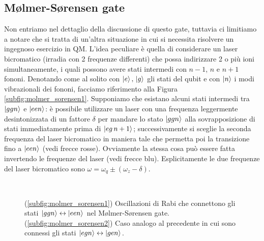\subsection{M\o lmer-S\o rensen gate}
Non entriamo nel dettaglio della discussione di questo gate, tuttavia ci limitiamo a notare che si tratta di un'altra situazione in cui si necessita risolvere un ingegnoso esercizio in QM. L'idea peculiare è quella di considerare un laser bicromatico (irradia con 2 frequenze differenti) che possa indirizzare 2 o più ioni simultaneamente, i quali possono avere stati intermedi con $n-1$, $n$ e $n+1$ fononi. Denotando come al solito con $\ket{e}, \, \ket{g}$ gli stati del qubit e con $\ket{n}$ i modi vibrazionali dei fononi, facciamo riferimento alla Figura \ref{subfig:molmer_sorensen1}. Supponiamo che esistano alcuni stati intermedi tra $\ket{ggn}$ e $\ket{een}$: è possibile utilizzare un laser con una frequenza leggermente desintonizzata di un fattore $\delta$ per mandare lo stato $\ket{ggn}$ alla sovrapposizione di stati immediatamente prima di $\ket{eg \, n+1}$; successivamente si sceglie la seconda frequenza del laser bicromatico in maniera tale che permetta poi la transizione fino a $\ket{een}$ (vedi frecce rosse). Ovviamente la stessa cosa può essere fatta invertendo le frequenze del laser (vedi frecce blu). Esplicitamente le due frequenze del laser bicromatico sono $\omega = \omega_q \pm (\omega_z - \delta)$. 

\begin{figure}[!h]
	\centering	
	 \\
	\caption{(\ref{subfig:molmer_sorensen1}) Oscillazioni di Rabi che connettono gli stati $\ket{ggn} \leftrightarrow \ket{een}$ nel M\o lmer-S\o rensen gate. (\ref{subfig:molmer_sorensen2}) Caso analogo al precedente in cui sono connessi gli stati $\ket{egn} \leftrightarrow \ket{gen}$.}
    \label{fig:molmer_sorensen}
\end{figure}

